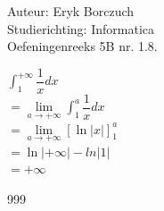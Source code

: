 \documentclass[a4paper]{article}
\begin{document}
  
\noindent \large Auteur: Eryk Borczuch \\
\noindent \large Studierichting: Informatica\\
\noindent \large Oefeningenreeks 5B nr. 1.8.\\

\medskip

\normalsize

$\displaystyle\int_{1}^{+\infty} \dfrac{1}{x} dx  $\\

$= \lim\limits_{a \to +\infty} \displaystyle\int_{1}^{a} \dfrac{1}{x} dx$\\

$= \lim\limits_{a \to +\infty} [\ln |x|]_{1}^{a}$\\

$= \ln|+\infty| - ln|1| $\\

$= +\infty$\\


\begin{thebibliography}{999}
\end{thebibliography}
\end{document}
